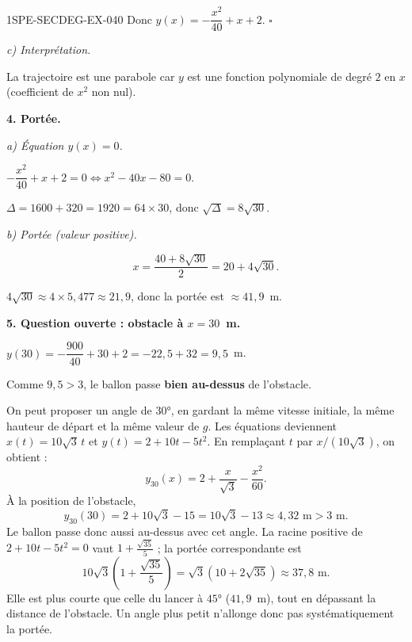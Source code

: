 \begin{corrige}{1SPE-SECDEG-EX-040}
Donc $y(x) = -\dfrac{x^2}{40} + x + 2$. \hfill $\square$

\textit{c) Interprétation.}

La trajectoire est une parabole car $y$ est une fonction polynomiale de degré $2$ en $x$ (coefficient de $x^2$ non nul).

\medskip
\textbf{4. Portée.}

\textit{a) Équation $y(x) = 0$.}


$-\dfrac{x^2}{40} + x + 2 = 0 \iff x^2 - 40x - 80 = 0$.

$\Delta = 1600 + 320 = 1920 = 64 \times 30$, donc $\sqrt{\Delta} = 8\sqrt{30}$.

\textit{b) Portée (valeur positive).}

\[x = \frac{40 + 8\sqrt{30}}{2} = 20 + 4\sqrt{30}.\]

$4\sqrt{30} \approx 4 \times 5{,}477 \approx 21{,}9$, donc la portée est $\approx 41{,}9$~m.

\medskip
\textbf{5. Question ouverte : obstacle à $x = 30$~m.}


$y(30) = -\dfrac{900}{40} + 30 + 2 = -22{,}5 + 32 = 9{,}5$~m.

Comme $9{,}5 > 3$, le ballon passe \textbf{bien au-dessus} de l'obstacle.

On peut proposer un angle de $30°$, en gardant la même vitesse initiale,
la même hauteur de départ et la même valeur de $g$.
Les équations deviennent $x(t)=10\sqrt{3}\,t$ et $y(t)=2+10t-5t^2$.
En remplaçant $t$ par $x/(10\sqrt{3})$, on obtient :
\[y_{30}(x)=2+\frac{x}{\sqrt{3}}-\frac{x^2}{60}.\]
À la position de l'obstacle,
\[y_{30}(30)=2+10\sqrt{3}-15=10\sqrt{3}-13\approx4{,}32\text{ m}>3\text{ m}.\]
Le ballon passe donc aussi au-dessus avec cet angle. La racine positive de
$2+10t-5t^2=0$ vaut $1+\frac{\sqrt{35}}{5}$ ; la portée correspondante est
\[10\sqrt{3}\left(1+\frac{\sqrt{35}}{5}\right)
=\sqrt{3}(10+2\sqrt{35})\approx37{,}8\text{ m}.\]
Elle est plus courte que celle du lancer à $45°$ ($41{,}9$~m), tout en dépassant
la distance de l'obstacle. Un angle plus petit n'allonge donc pas systématiquement la portée.

\end{corrige}

